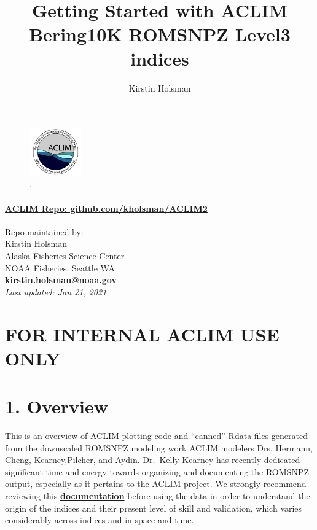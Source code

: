 \documentclass[
]{article}
\title{Getting Started with ACLIM Bering10K ROMSNPZ Level3 indices}
\author{Kirstin Holsman}
\date{}
\begin{document}
\maketitle

{
\setcounter{tocdepth}{2}
\tableofcontents
}
\begin{figure}
\centering
\includegraphics[width=0.2\textwidth,height=\textheight]{Figs/ACLIM_logo.jpg}
\caption{.}
\end{figure}

\hypertarget{aclim-repo-github.comkholsmanaclim2}{%
\paragraph{\texorpdfstring{\href{https://github.com/kholsman/ACLIM2}{\textbf{ACLIM
Repo:
github.com/kholsman/ACLIM2}}}{ACLIM Repo: github.com/kholsman/ACLIM2}}\label{aclim-repo-github.comkholsmanaclim2}}

Repo maintained by:\\
Kirstin Holsman\\
Alaska Fisheries Science Center\\
NOAA Fisheries, Seattle WA\\
\textbf{\url{kirstin.holsman@noaa.gov}}~\\
\emph{Last updated: Jan 21, 2021}

\hypertarget{for-internal-aclim-use-only}{%
\section{FOR INTERNAL ACLIM USE
ONLY}\label{for-internal-aclim-use-only}}

\hypertarget{overview}{%
\section{1. Overview}\label{overview}}

This is an overview of ACLIM plotting code and ``canned'' Rdata files
generated from the downscaled ROMSNPZ modeling work ACLIM modelers Drs.
Hermann, Cheng, Kearney,Pilcher, and Aydin. Dr.~Kelly Kearney has
recently dedicated significant time and energy towards organizing and
documenting the ROMSNPZ output, especially as it pertains to the ACLIM
project. We strongly recommend reviewing this
\href{https://beringnpz.github.io/roms-bering-sea/B10K-dataset-docs/}{\textbf{documentation}}
before using the data in order to understand the origin of the indices
and their present level of skill and validation, which varies
considerably across indices and in space and time.
\end{document}
